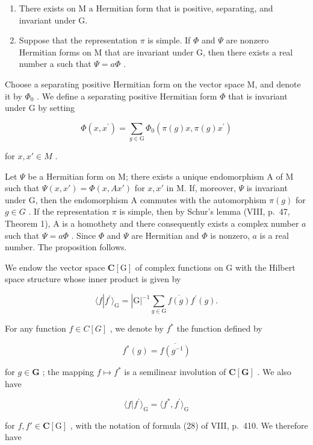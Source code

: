 \begin{enumerate}
\def\labelenumi{\alph{enumi})}
\item
  There exists on M a Hermitian form that is positive, separating, and invariant under G.
\item
  Suppose that the representation \(\pi\) is simple. If \(\Phi\) and \(\Psi\) are nonzero Hermitian forms on M that are invariant under G, then there exists a real number a such that \(\Psi = a\Phi\) .
\end{enumerate}

Choose a separating positive Hermitian form on the vector space M, and denote it by \(\Phi_{0}\) . We define a separating positive Hermitian form \(\Phi\) that is invariant under G by setting

\[
\Phi (x, x ^ {\prime}) = \sum_ {g \in \mathrm{G}} \Phi_ {0} (\pi (g) x, \pi (g) x ^ {\prime})\tag{49}
\]

for \(x, x' \in M\) .

Let \(\Psi\) be a Hermitian form on M; there exists a unique endomorphism A of M such that \(\Psi(x, x') = \Phi(x, Ax')\) for \(x, x'\) in M. If, moreover, \(\Psi\) is invariant under G, then the endomorphism A commutes with the automorphism \(\pi(g)\) for \(g \in G\) . If the representation \(\pi\) is simple, then by Schur's lemma (VIII, p.~47, Theorem 1), A is a homothety and there consequently exists a complex number \(a\) such that \(\Psi = a\Phi\) . Since \(\Phi\) and \(\Psi\) are Hermitian and \(\Phi\) is nonzero, \(a\) is a real number. The proposition follows.

We endow the vector space \(\mathbf{C}[\mathrm{G}]\) of complex functions on \(\mathrm{G}\) with the Hilbert space structure whose inner product is given by

\[
\langle f | f ^ {\prime} \rangle_ {\mathrm{G}} = | \mathrm{G} | ^ {- 1} \sum_ {g \in \mathrm{G}} \overline {{f (g)}} f ^ {\prime} (g).\tag{50}
\]

For any function \(f \in C[G]\) , we denote by \(f^{*}\) the function defined by

\[
f ^ {*} (g) = \overline {{f (g ^ {- 1})}}\tag{51}
\]

for \(g \in \mathbf{G}\) ; the mapping \(f \mapsto f^*\) is a semilinear involution of \(\mathbf{C}[\mathbf{G}]\) . We also have

\[
\langle f | f ^ {\prime} \rangle_ {\mathrm{G}} = \langle f ^ {*}, f ^ {\prime} \rangle_ {\mathrm{G}}\tag{52}
\]

for \(f, f' \in \mathbf{C}[\mathrm{G}]\) , with the notation of formula (28) of VIII, p.~410. We therefore have


